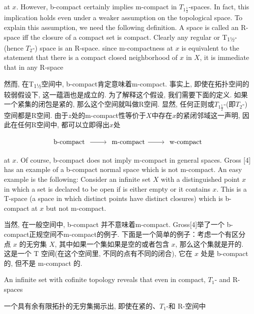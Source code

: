 \documentclass[options]{article}
\begin{document}
\begin{paracol}{2}
	\begin{en}
		\noindent at $x$. However, b-compact certainly implies m-compact in $T_{1
				\frac{1}{2}}$-spaces. In fact, this implication holds even under a weaker assumption on
		the topological space. To explain this assumption, we need the following definition. A
		space is called an R-space iff the closure of a compact set is compact. Clearly any
		regular or T\textsubscript{\!$1$½}-(hence $T_{2}$-) space is an R-space. since
		m-compactness at $x$ is equivalent to the statement that there is a compact
		closed neighborhood of $x$ in $X$, it is immediate that in any R-space
	\end{en}
	\begin{cn}
		\noindent 然而, 在T\textsubscript{\!$1$½}空间中, b-compact肯定意味着m-compact. 事实上, 即使在拓扑空间的较弱假设下, 这一蕴涵也是成立的. 为了解释这个假设, 我们需要下面的定义. 如果一个紧集的闭包是紧的, 那么这个空间就叫做R空间. 显然, 任何正则或$T_{1\frac{1}{2}}$-(即$T_{2}$-)空间都是R空间. 由于$z$处的m-compact性等价于$X$中存在$x$的紧闭邻域这一声明, 因此在任何R空间中, 都可以立即得出$x$处
	\end{cn}
\end{paracol}
\[
		\begin{tikzcd}
			\text{ b-compact }\ar[r]&\text { m-compact}\ar[r]& \text { w-compact }
		\end{tikzcd}
\]
\begin{paracol}{2}
	\begin{en}
		at $x$. Of course, b-compact does not imply m-compact in general spaces.
		Gross [4] has an example of a b-compact normal space which is not m-compact.
		An easy example is the following: Consider an infinite set $X$ with a
		distinguished point $x$ in which a set is declared to be open if is either
		empty or it contains $x$. This is a T\textsubscript{}-space (a space in which
		distinct points have distinct closures) which is b-compact at $x$ but not
		m-compact.
	\end{en}
	\begin{cn}
		当然, 在一般空间中, b-compact 并不意味着m-compact. Gross[4]举了一个 b-compact正规空间不m-compact的例子. 下面是一个简单的例子：考虑一个有区分点 $x$ 的无穷集 $X$, 其中如果一个集如果是空的或者包含 $x$, 那么这个集就是开的. 这是一个 T\textsubscript{} 空间(在这个空间里, 不同的点有不同的闭合), 它在 $x$ 处是 b-compact 的, 但不是 m-compact 的.
	\end{cn}
	\begin{en}
		An infinite set with cofinite topology reveals that even in compact, $T_1$- and R-spaces

	\end{en}
	\begin{cn}
		一个具有余有限拓扑的无穷集揭示出, 即使在紧的、$T_1$-和 R-空间中
	\end{cn}
\end{paracol}
\end{document}
